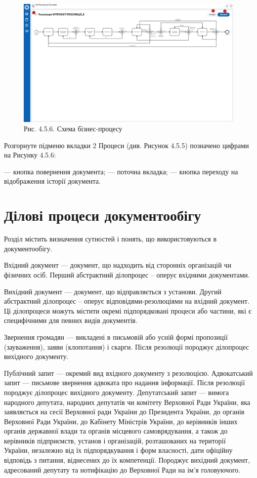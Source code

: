\begin{figure}[!htbp]
\centerline{\includegraphics[width=\textwidth]{img/4.5.6.png}}
\caption{Рис. 4.5.6. Схема бізнес-процесу}
\end{figure}

Розгорнуте підменю вкладки 2 Процеси (див. Рисунок 4.5.5) позначено цифрами на Рисунку 4.5.6:

 --- кнопка повернення документа;
 --- поточна вкладка;
 --- кнопка переходу на відображення історії документа.

\chapter{Ділові процеси документообігу}

Розділ містить визначення сутностей і понять, що використовуються в
документообігу.

Вхідний документ — документ, що надходить від сторонніх організацій чи
фізичних осіб. Перший абстрактний ділопроцес – оперує вхідними документами.

Вихідний документ — документ, що відправляється з установи. Другий
абстрактний ділопроцес – оперує відповідями-резолюціями на вхідний документ.
Ці ділопроцеси можуть містити окремі підпорядковані процеси або частини, які є
специфічними для певних видів документів.

Звернення громадян — викладені в письмовій або усній формі пропозиції
(зауваження), заяви (клопотання) і скарги. Після резолюції породжує ділопроцес
вихідного документу.

Публічний запит — окремий вид вхідного документу з резолюцією.
Адвокатський запит — письмове звернення адвоката про надання інформації.
Після резолюції породжує ділопроцес вихідного документу.
Депутатський запит — вимога народного депутата, народних депутатів чи
комітету Верховної Ради України, яка заявляється на сесії Верховної ради України
до Президента України, до органів Верховної Ради України, до Кабінету Міністрів
України, до керівників інших органів державної влади та органів місцевого
самоврядування, а також до керівників підприємств, установ і організацій,
розташованих на території України, незалежно від їх підпорядкування і форм
власності, дати офіційну відповідь з питання, віднесених до їх компетенції.
Породжує вихідний документ, адресований депутату та нотифікацію до Верховної
Ради на ім’я головуючого.

